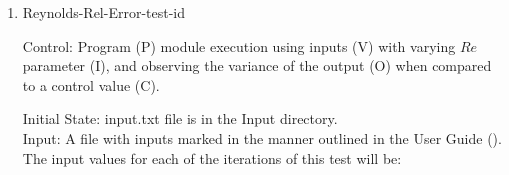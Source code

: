 \documentclass[12pt, titlepage]{article}
\newcommand{\famname}{Lattice Boltzmann Solver}
\newcounter{testcounter} %
\begin{document}
\begin{enumerate}
How test will be performed:

\begin{enumerate}
\item The Von Karman Vortex Street module shall be modified by the author to
  print the vorticity vector as output.
\item Outside of the system, the input parameter values will be written to a text file titled input.txt, as outlined in the User Guide.
\item The file will be placed into the Input directory, under the home directory
  of the project.
\item {\famname} shall be run.  
\item Upon completion of the module, the output values of the vorticity vector
  will be compared to the vorticity vector values from pyLBM - comparison will
  be done per cell. Comparisons can be done manually using Excel, or through a
  script, using the equation for relative error found in Section \ref{eqerror}.
\end{enumerate}


\item{Reynolds-Rel-Error-test-id\thetestcounter \\}

Control: Program (P) module execution using inputs (V) with varying $Re$
parameter (I), and observing the variance of the output (O) when compared to a control value (C).  %
				
					
Initial State: input.txt file is in the Input directory.\\
					
Input: A file with inputs marked in the manner outlined in the User Guide (\citet{LBM_UserGuide_PM}).\\The input values for each of the iterations of this test will be:\\


\end{enumerate}
\end{document}
